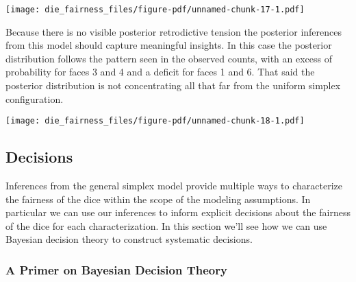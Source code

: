 \documentclass[
  letterpaper,
  DIV=11,
  numbers=noendperiod]{scrartcl}
\newenvironment{Shaded}{\begin{snugshade}}{\end{snugshade}}
\newcommand{\AttributeTok}[1]{\textcolor[rgb]{0.40,0.45,0.13}{#1}}
\newcommand{\ControlFlowTok}[1]{\textcolor[rgb]{0.00,0.23,0.31}{#1}}
\newcommand{\DecValTok}[1]{\textcolor[rgb]{0.68,0.00,0.00}{#1}}
\newcommand{\FunctionTok}[1]{\textcolor[rgb]{0.28,0.35,0.67}{#1}}
\newcommand{\NormalTok}[1]{\textcolor[rgb]{0.00,0.23,0.31}{#1}}
\newcommand{\OtherTok}[1]{\textcolor[rgb]{0.00,0.23,0.31}{#1}}
\newcommand{\SpecialCharTok}[1]{\textcolor[rgb]{0.37,0.37,0.37}{#1}}
\newcommand{\StringTok}[1]{\textcolor[rgb]{0.13,0.47,0.30}{#1}}
\begin{document}
\texttt{[image: die\_fairness\_files/figure-pdf/unnamed-chunk-17-1.pdf]}

Because there is no visible posterior retrodictive tension the posterior
inferences from this model should capture meaningful insights. In this
case the posterior distribution follows the pattern seen in the observed
counts, with an excess of probability for faces 3 and 4 and a deficit
for faces 1 and 6. That said the posterior distribution is not
concentrating all that far from the uniform simplex configuration.

\begin{Shaded}
\end{Shaded}

\texttt{[image: die\_fairness\_files/figure-pdf/unnamed-chunk-18-1.pdf]}

\subsection{Decisions}\label{decisions}

Inferences from the general simplex model provide multiple ways to
characterize the fairness of the dice within the scope of the modeling
assumptions. In particular we can use our inferences to inform explicit
decisions about the fairness of the dice for each characterization. In
this section we'll see how we can use Bayesian decision theory to
construct systematic decisions.

\subsubsection{A Primer on Bayesian Decision
Theory}\label{a-primer-on-bayesian-decision-theory}
\end{document}
